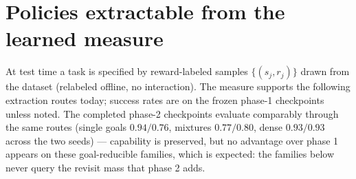 \documentclass[10pt]{article}
\begin{document}
\section{Policies extractable from the learned measure}

At test time a task is specified by reward-labeled samples $\{(s_j, r_j)\}$ drawn from the dataset (relabeled offline, no interaction).
The measure supports the following extraction routes today; success rates are on the frozen
phase-1 checkpoints unless noted.
The completed phase-2 checkpoints evaluate comparably through the same routes (single goals
$0.94/0.76$, mixtures $0.77/0.80$, dense $0.93/0.93$ across the two seeds) --- capability
is preserved, but no advantage over phase 1 appears on these goal-reducible families, which
is expected: the families below never query the revisit mass that phase 2 adds.
\end{document}
